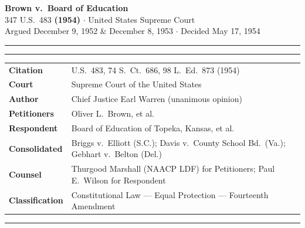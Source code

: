 \documentclass[11pt, letterpaper]{article}
\begin{document}
\begin{center}
  {\Large\bfseries\color{accent}%
    Brown v.\ Board of Education}\\[4pt]
  {\normalsize\color{navyblue}%
    347 U.S.\ 483 \textbf{(1954)}
    \enspace$\cdot$\enspace
    United States Supreme Court}\\[3pt]
  {\small\color{midgray}
    \enspace Argued December 9, 1952 \& December 8, 1953
    \enspace$\cdot$\enspace
    \enspace Decided May 17, 1954}
\end{center}

\vspace{4pt}
\color{accent}\rule{\linewidth}{1.2pt}
\color{navyblue}\rule{\linewidth}{0.3pt}
\vspace{4pt}

\begin{tabularx}{\linewidth}{@{}>{\color{accent}\bfseries}l@{\hspace{8mm}}>{\raggedright\arraybackslash}X@{}}
  Citation        & 347 U.S.\ 483, 74 S.\ Ct.\ 686, 98 L.\ Ed.\ 873 (1954)                        \\[2pt]
  Court           & Supreme Court of the United States                                              \\[2pt]
  Author          & Chief Justice Earl Warren (unanimous opinion)                                   \\[2pt]
  Petitioners     & Oliver L.\ Brown, et al.                                                        \\[2pt]
  Respondent      & Board of Education of Topeka, Kansas, et al.                                    \\[2pt]
  Consolidated    & Briggs v.\ Elliott (S.C.); Davis v.\ County School Bd.\ (Va.);
                    Gebhart v.\ Belton (Del.)                                                       \\[2pt]
  Counsel         & Thurgood Marshall (NAACP LDF) for Petitioners;
                    Paul E.\ Wilson for Respondent                                                  \\[2pt]
  Classification  & Constitutional Law --- Equal Protection --- Fourteenth Amendment                 \\
\end{tabularx}

\vspace{6pt}
\color{rulegray}\rule{\linewidth}{0.4pt}
\vspace{2pt}












\end{document}
